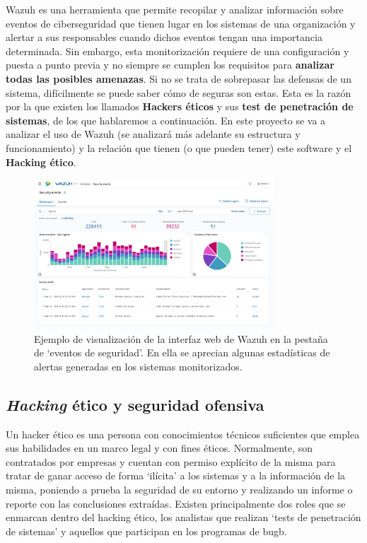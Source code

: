 Wazuh es una herramienta que permite recopilar y analizar información sobre eventos de ciberseguridad que tienen lugar en los sistemas de una organización y alertar a sus responsables cuando dichos eventos tengan una importancia determinada. Sin embargo, esta monitorización requiere de una configuración y puesta a punto previa y no siempre se cumplen los requisitos para \textbf{analizar todas las posibles amenazas}. Si no se trata de sobrepasar las defensas de un sistema, difícilmente se puede saber cómo de seguras son estas. Esta es la razón por la que existen los llamados \textbf{Hackers éticos} y sus \textbf{test de penetración de sistemas}, de los que hablaremos a continuación. En este proyecto se va a analizar el uso de Wazuh (se analizará más adelante su estructura y funcionamiento) y la relación que tienen (o que pueden tener) este software y el \textbf{Hacking ético}.

\begin{figure}[hbtp]
  \centering
  \includegraphics[width=0.8\textwidth]{imagenes/wazuh_kibana.png}
  \caption{Ejemplo de visualización de la interfaz web de Wazuh en la pestaña de `eventos de seguridad'. En ella se aprecian algunas estadísticas de alertas generadas en los sistemas monitorizados.}
\end{figure}

\subsection{\textit{Hacking} ético y seguridad ofensiva}

Un hacker ético es una persona con conocimientos técnicos suficientes que emplea sus habilidades en un marco legal y con fines éticos. Normalmente, son contratados por empresas y cuentan con permiso explícito de la misma para tratar de ganar acceso de forma `ilícita' a los sistemas y a la información de la misma, poniendo a prueba la seguridad de su entorno y realizando un informe o reporte con las conclusiones extraídas. Existen principalmente dos roles que se enmarcan dentro del hacking ético, los analistas que realizan `tests de penetración de sistemas' y aquellos que participan en los programas de \gls{bugb}.

